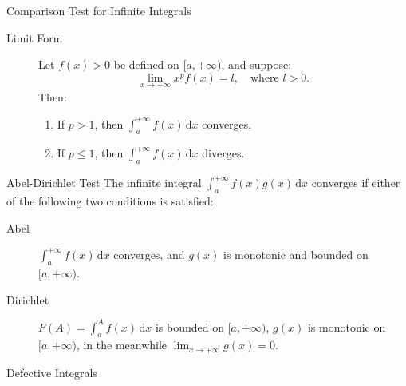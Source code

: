 \documentclass[11pt]{../../TexTemplate/elegantbook}
\begin{document}
\begin{theorem}{Comparison Test for Infinite Integrals}
\begin{description}
    \item[Limit Form] Let \( f(x) > 0 \) be defined on \( [a, +\infty) \), and suppose:
    \[
    \lim_{x \to +\infty} x^p f(x) = l, \quad \text{where } l > 0.
    \]
    Then:
    \begin{enumerate}[label=\roman*)]
        \item If \( p > 1 \), then \( \int_{a}^{+\infty} f(x) \, \mathrm{d}x \) converges.
        \item If \( p \leqslant 1 \), then \( \int_{a}^{+\infty} f(x) \, \mathrm{d}x \) diverges.
    \end{enumerate}
\end{description}
\end{theorem}

\begin{theorem}{Abel-Dirichlet Test}
    The infinite integral \( \int_{a}^{+\infty} f(x)g(x) \, \mathrm{d}x \) converges 
    if either of the following two conditions is satisfied:
    \begin{description}
        \item [Abel] \( \int_{a}^{+\infty} f(x) \, \mathrm{d}x \) converges, 
            and \( g(x) \) is monotonic and bounded on \( [a, +\infty) \).
        \item [Dirichlet] \( F(A) = \int_{a}^{A} f(x) \, \mathrm{d}x \) is bounded on \( [a, +\infty) \), 
            \( g(x) \) is monotonic on \( [a, +\infty) \), in the meanwhile \( \lim_{x \to +\infty} g(x) = 0 \).
    \end{description}
\end{theorem}


\begin{leftbarTitle}{Defective Integrals}\end{leftbarTitle}
\end{document}
